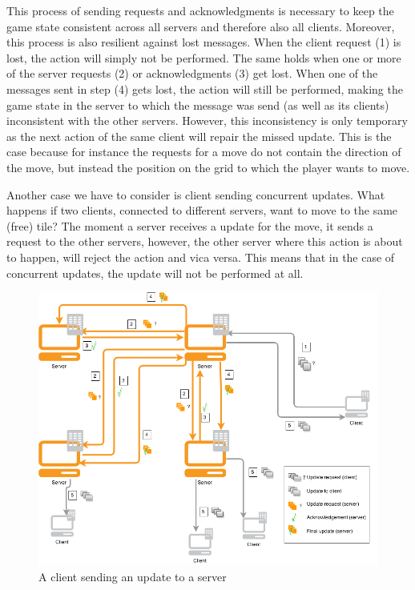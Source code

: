 This process of sending requests and acknowledgments is necessary to keep the game state consistent across all servers and therefore also all clients. Moreover, this process is also resilient against lost messages. When the client request (1) is lost, the action will simply not be performed. The same holds when one or more of the server requests (2) or acknowledgments (3) get lost. When one of the messages sent in step (4) gets lost, the action will still be performed, making the game state in the server to which the message was send (as well as its clients) inconsistent with the other servers. However, this inconsistency is only temporary as the next action of the same client will repair the missed update. This is the case because for instance the requests for a move do not contain the direction of the move, but instead the position on the grid to which the player wants to move.

Another case we have to consider is client sending concurrent updates. What happens if two clients, connected to different servers, want to move to the same (free) tile? The moment a server receives a update for the move, it sends a request to the other servers, however, the other server where this action is about to happen, will reject the action and vica versa. This means that in the case of concurrent updates, the update will not be performed at all.

\begin{figure}[h!]
  \centering
    \includegraphics[width=\textwidth]{diagrams/game-update}
    
  \caption{A client sending an update to a server}
  \label{update_diagram}
\end{figure}

